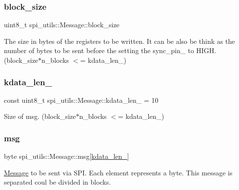 \subsubsection{\texorpdfstring{block\+\_\+size}{block\_size}}
{\footnotesize\ttfamily uint8\+\_\+t spi\+\_\+utils\+::\+Message\+::block\+\_\+size}

The size in bytes of the registers to be written. It can be also be think as the number of bytes to be sent before the setting the sync\+\_\+pin\+\_\+ to H\+I\+GH. (block\+\_\+size$\ast$n\+\_\+blocks $<$= kdata\+\_\+len\+\_\+) \mbox{\label{structspi__utils_1_1Message_a47848d542d0954679bad7a40dc5b0064}} 
\subsubsection{\texorpdfstring{kdata\+\_\+len\+\_\+}{kdata\_len\_}}
{\footnotesize\ttfamily const uint8\+\_\+t spi\+\_\+utils\+::\+Message\+::kdata\+\_\+len\+\_\+ = 10\hspace{0.3cm}{\ttfamily [static]}}

Size of msg. (block\+\_\+size$\ast$n\+\_\+blocks $<$= kdata\+\_\+len\+\_\+) \mbox{\label{structspi__utils_1_1Message_aef999e9fd6fe0d4ab21aa2a6bf740f55}} 
\subsubsection{\texorpdfstring{msg}{msg}}
{\footnotesize\ttfamily byte spi\+\_\+utils\+::\+Message\+::msg\mbox{[}\mbox{\hyperlink{structspi__utils_1_1Message_a47848d542d0954679bad7a40dc5b0064}{kdata\+\_\+len\+\_\+}}\mbox{]}}

\mbox{\hyperlink{structspi__utils_1_1Message}{Message}} to be sent via S\+PI. Each element represents a byte. This message is separated coul be divided in blocks. \mbox{\label{structspi__utils_1_1Message_a00d125aa721450f39c7ae0310090af65}} 
